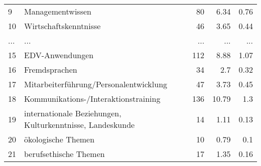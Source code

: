 \begin{longtable}{lXrrr}
        9 & \multicolumn{1}{X}{Managementwissen} & %
          \num{80} &
          \num[round-mode=places,round-precision=2]{6,34} &
          \num[round-mode=places,round-precision=2]{0,76} \\
        10 & \multicolumn{1}{X}{Wirtschaftskenntnisse} & %
          \num{46} &
          \num[round-mode=places,round-precision=2]{3,65} &
          \num[round-mode=places,round-precision=2]{0,44} \\
       ... & ... & ... & ... & ... \\
        15 & \multicolumn{1}{X}{EDV-Anwendungen} & %
          \num{112} &
          \num[round-mode=places,round-precision=2]{8,88} &
          \num[round-mode=places,round-precision=2]{1,07} \\

        16 & \multicolumn{1}{X}{Fremdsprachen} & %
          \num{34} &
          \num[round-mode=places,round-precision=2]{2,7} &
          \num[round-mode=places,round-precision=2]{0,32} \\

        17 & \multicolumn{1}{X}{Mitarbeiterführung/Personalentwicklung} & %
          \num{47} &
          \num[round-mode=places,round-precision=2]{3,73} &
          \num[round-mode=places,round-precision=2]{0,45} \\

        18 & \multicolumn{1}{X}{Kommunikations-/Interaktionstraining} & %
          \num{136} &
          \num[round-mode=places,round-precision=2]{10,79} &
          \num[round-mode=places,round-precision=2]{1,3} \\

        19 & \multicolumn{1}{X}{internationale Beziehungen, Kulturkenntnisse, Landeskunde} & %
          \num{14} &
          \num[round-mode=places,round-precision=2]{1,11} &
          \num[round-mode=places,round-precision=2]{0,13} \\

        20 & \multicolumn{1}{X}{ökologische Themen} & %
          \num{10} &
          \num[round-mode=places,round-precision=2]{0,79} &
          \num[round-mode=places,round-precision=2]{0,1} \\

        21 & \multicolumn{1}{X}{berufsethische Themen} & %
          \num{17} &
          \num[round-mode=places,round-precision=2]{1,35} &
          \num[round-mode=places,round-precision=2]{0,16} \\


\end{longtable}
